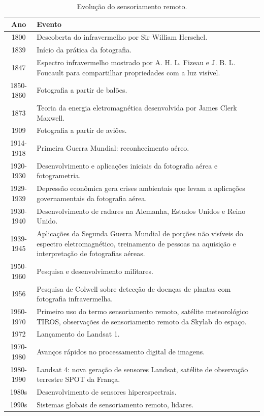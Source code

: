 \begin{table}[!htb]
\caption{Evolução do sensoriamento remoto.} \label{tab:evolucao_sr}
\begin{tabularx}{\textwidth}{|c|X|} \hline
\textbf{Ano} & \textbf{Evento} \\ \hline
1800         & Descoberta do infravermelho por Sir William Herschel. \\ \hline
1839         & Início da prática da fotografia. \\ \hline
1847         & Espectro infravermelho mostrado por A. H. L. Fizeau e J. B. L. Foucault para compartilhar propriedades com a luz visível. \\ \hline
1850-1860    & Fotografia a partir de balões. \\ \hline
1873         & Teoria da energia eletromagnética desenvolvida por James Clerk Maxwell. \\ \hline
1909         & Fotografia a partir de aviões. \\ \hline
1914-1918    & Primeira Guerra Mundial: reconhecimento aéreo. \\ \hline
1920-1930    & Desenvolvimento e aplicações iniciais da fotografia aérea e fotogrametria. \\ \hline
1929-1939    & Depressão econômica gera crises ambientais que levam a aplicações governamentais da fotografia aérea. \\ \hline
1930-1940    & Desenvolvimento de radares na Alemanha, Estados Unidos e Reino Unido. \\ \hline
1939-1945    & Aplicações da Segunda Guerra Mundial de porções não visíveis do espectro eletromagnético, treinamento de pessoas na aquisição e interpretação de fotografias aéreas. \\ \hline
1950-1960    & Pesquisa e desenvolvimento militares. \\ \hline
1956         & Pesquisa de Colwell sobre detecção de doenças de plantas com fotografia infravermelha. \\ \hline
1960-1970    & Primeiro uso do termo sensoriamento remoto, satélite meteorológico TIROS, observações de sensoriamento remoto da Skylab do espaço. \\ \hline
1972         & Lançamento do Landsat 1. \\ \hline
1970-1980    & Avanços rápidos no processamento digital de imagens. \\ \hline
1980-1990    & Landsat 4: nova geração de sensores Landsat, satélite de observação terrestre SPOT da França. \\ \hline
1980s        & Desenvolvimento de sensores hiperespectrais. \\ \hline
1990s        & Sistemas globais de sensoriamento remoto, lidares. \\ \hline
\end{tabularx}
\end{table}

